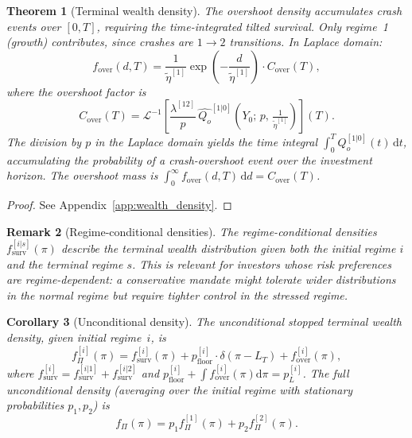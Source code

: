 \documentclass[11pt,a4paper]{article}
\numberwithin{equation}{section}
\newtheorem{theorem}{Theorem}[section]
\newtheorem{corollary}[theorem]{Corollary}
\newtheorem{remark}[theorem]{Remark}
\newcommand{\Lp}{\mathcal{L}}
\newcommand{\dd}{\mathrm{d}}
\begin{document}
\begin{theorem}[Terminal wealth density]
The overshoot density accumulates crash events over $[0,T]$, requiring the time-integrated tilted survival.  Only regime~1 (growth) contributes, since crashes are $1 \to 2$ transitions. In Laplace domain:
\begin{equation}\label{eq:overshoot_density}
f_{\mathrm{over}}(d, T) = \frac{1}{\tilde\eta^{[1]}} \exp\!\left(-\frac{d}{\tilde\eta^{[1]}}\right) \cdot C_{\mathrm{over}}(T),
\end{equation}
where the overshoot factor is
\begin{equation}\label{eq:overshoot_factor}
C_{\mathrm{over}}(T) = \Lp^{-1}\!\left[\frac{\lambda^{[12]}}{p}\, \widehat{Q_o}^{[1|0]}\!\left(Y_0;\, p,\, \tfrac{1}{\tilde\eta^{[1]}}\right)\right]\!(T).
\end{equation}
The division by $p$ in the Laplace domain yields the time integral $\int_0^T Q_o^{[1|0]}(t)\,\dd t$, accumulating the probability of a crash-overshoot event over the investment horizon. The overshoot mass is $\int_0^\infty f_{\mathrm{over}}(d,T)\,\dd d = C_{\mathrm{over}}(T)$.
\end{theorem}

\begin{proof}
See Appendix~\ref{app:wealth_density}.
\end{proof}

\begin{remark}[Regime-conditional densities]\label{rem:regime_density}
The regime-conditional densities $f^{[i|s]}_{\mathrm{surv}}(\pi)$ describe the terminal wealth distribution given both the initial regime $i$ and the terminal regime $s$. This is relevant for investors whose risk preferences are regime-dependent: a conservative mandate might tolerate wider distributions in the normal regime but require tighter control in the stressed regime.
\end{remark}

\begin{corollary}[Unconditional density]\label{cor:uncond_density}
The unconditional stopped terminal wealth density, given initial regime~$i$, is
\begin{equation}\label{eq:uncond_density}
f^{[i]}_{\Pi}(\pi) = f^{[i]}_{\mathrm{surv}}(\pi) + p^{[i]}_{\mathrm{floor}} \cdot \delta(\pi - L_T) + f^{[i]}_{\mathrm{over}}(\pi),
\end{equation}
where $f^{[i]}_{\mathrm{surv}} = f^{[i|1]}_{\mathrm{surv}} + f^{[i|2]}_{\mathrm{surv}}$ and $p^{[i]}_{\mathrm{floor}} + \int f^{[i]}_{\mathrm{over}}(\pi)\dd\pi = p^{[i]}_L$. The full unconditional density (averaging over the initial regime with stationary probabilities $p_1, p_2$) is
\begin{equation}
f_\Pi(\pi) = p_1 f^{[1]}_\Pi(\pi) + p_2 f^{[2]}_\Pi(\pi).
\end{equation}
\end{corollary}
\end{document}

